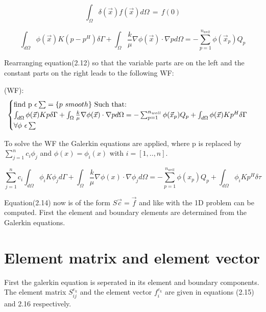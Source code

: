 \documentclass[a4paper]{report}
\begin{document}
\begin{equation}
	\int_{\Omega}\delta(\vec{x})f(\vec{x})d\Omega \, = \, f(0)	
\end{equation}



\begin{equation}
	\int_{d\Omega}\phi(\vec{x})K(p-p^H)\delta\Gamma+\int_{\Omega}\frac{k}{\mu}\nabla\phi(\vec{x})\cdot\nabla p d\Omega= -\sum_{p=1}^{n_{well}}\phi(\vec{x}_p) Q_p
\end{equation}	

Rearranging equation(2.12) so that the variable parts are on the left and the constant parts on the right leads to the following WF:
\vspace{5mm}


(WF): \begin{equation}
		\begin{cases} 
			$find p $\epsilon \sum =\{p$ $ smooth\}$ Such that:$ \\
			\int_{d\Omega}\phi(\vec{x})Kp\delta\Gamma+\int_{\Omega}\frac{k}{\mu}\nabla\phi(\vec{x})\cdot\nabla p d\Omega= -\sum_{p=1}^{n_{well}}\phi(\vec{x}_p) Q_p +\int_{d\Omega}\phi(\vec{x})Kp^H\delta\Gamma\\ \forall\phi $ $ \epsilon\sum 
		\end{cases}\  
	\end{equation}

To solve the WF the Galerkin equations are applied, where p is replaced by $ \sum_{j=1}^{n}c_i\phi_j $ and  $\phi(x)=\phi_i(x)$ with $i = [1,..,n]$.

\begin{equation}
	\sum_{j=1}^{n}c_i\int_{d\Omega}\phi_i K\phi_j d\Gamma + \int_{\Omega}\frac{k}{\mu}\nabla\phi(x)\cdot\nabla \phi_j d\Omega= -\sum_{p=1}^{n_{well}}\phi(x_p) Q_p +\int_{d\Omega}\phi_i Kp^H\delta\tau
\end{equation}

Equation(2.14) now is of the form $S\vec{c}=\vec{f}$ and like with the 1D problem can be computed. First the element and boundary elements are determined from the Galerkin equations.


\section{Element matrix and element vector}

First the galerkin equation is seperated in its element and boundary components. The element matrix $S^{e_k}_{ij}$ and the element vector $f^{e_k}_i$ are given in equations (2.15) and 2.16 respectively.
\end{document}
